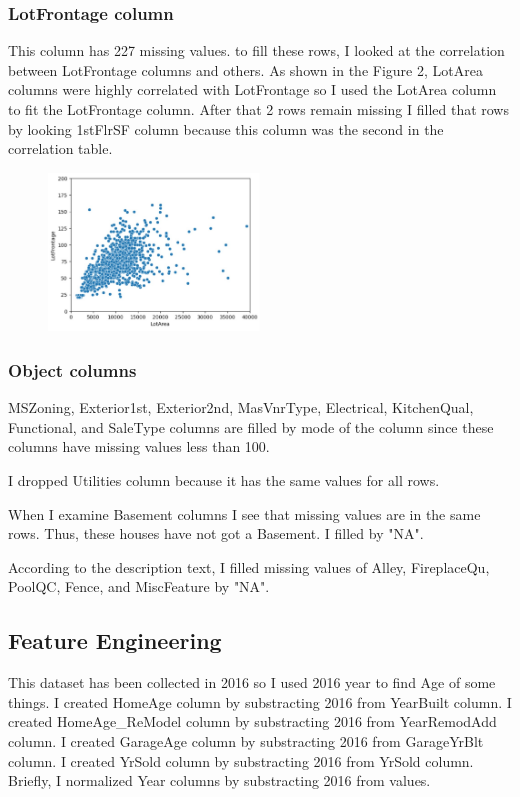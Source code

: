 \subsubsection{LotFrontage column}This column has 227 missing values. to fill these rows, I looked at the correlation between LotFrontage columns and others. As shown in the Figure 2, LotArea columns were highly correlated with LotFrontage so I used the LotArea column to fit the LotFrontage column.  After that 2 rows remain missing I filled that rows by looking 1stFlrSF column because this column was the second in the correlation table.
\begin{figure}[H]
  \centering
  \includegraphics[width=0.5\textwidth]{./fig/lotfront.jpg}
  \label{fig:comp}
  \caption{}
\end{figure}




\subsubsection{Object columns}
MSZoning, Exterior1st, Exterior2nd, MasVnrType, Electrical, KitchenQual, Functional, and SaleType columns are filled by mode of the column since these columns have missing values less than 100.

I dropped Utilities column because it has the same values for all rows.

When I examine Basement columns I see that missing values are in the same rows. Thus, these houses have not got a Basement. I filled by "NA".

According to the description text, I filled missing values of Alley, FireplaceQu, PoolQC, Fence, and MiscFeature by "NA".




\subsection{Feature Engineering}
This dataset has been collected in 2016 so I used 2016 year to find Age of some things. I created HomeAge column by substracting 2016 from YearBuilt column. 
I created HomeAge\_ReModel column by substracting 2016 from YearRemodAdd column. 
I created GarageAge column by substracting 2016 from GarageYrBlt column. 
I created YrSold column by substracting 2016 from YrSold column. Briefly, I normalized Year columns by substracting 2016 from values.

